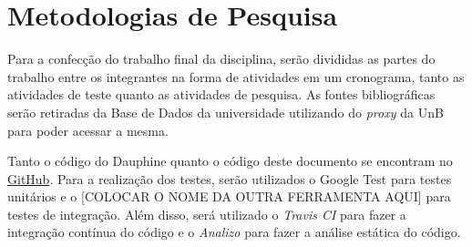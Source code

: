 \chapter[Metodologias de Pesquisa]{Metodologias de Pesquisa}

Para a confecção do trabalho final da disciplina, serão divididas as partes do trabalho entre os integrantes na forma de atividades em um cronograma, tanto as atividades de teste quanto as atividades de pesquisa. As fontes bibliográficas serão retiradas da Base de Dados da universidade utilizando do \textit{proxy} da UnB para poder acessar a mesma. 

Tanto o código do Dauphine quanto o código deste documento se encontram no \href{https://github.com/CaioIcy/Dauphine}{GitHub}. Para a realização dos testes, serão utilizados o Google Test para testes unitários e o [COLOCAR O NOME DA OUTRA FERRAMENTA AQUI] para testes de integração. Além disso, será utilizado o \textit{Travis CI} para fazer a integração contínua do código e o \textit{Analizo} para fazer a análise estática do código.
